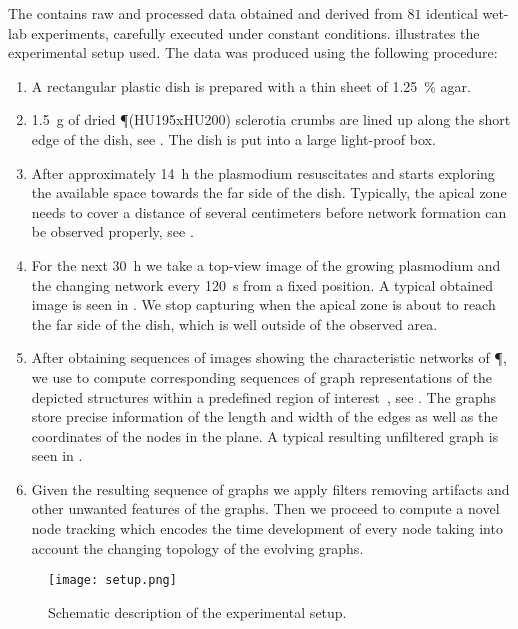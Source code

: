 	The \data contains raw and processed data obtained and derived from $81$ identical wet-lab experiments, carefully executed under constant conditions.  illustrates the experimental setup used. The data was produced using the following procedure:

	\begin{enumerate}
		\item A rectangular plastic dish is prepared with a thin sheet of \SI{1.25}{\percent} agar.
		\item \SI{1.5}{\gram} of dried \P (HU195xHU200) sclerotia crumbs are lined up along the short edge of the dish, see . The dish is put into a large light-proof box.
		\item After approximately \SI{14}{\hour} the plasmodium resuscitates and starts exploring the available space towards the far side of the dish. Typically, the apical zone needs to cover a distance of several centimeters before network formation can be observed properly, see .
		\item For the next \SI{30}{\hour} we take a top-view image of the growing plasmodium and the changing network every \SI{120}{\second} from a fixed position. A typical obtained image is seen in . We stop capturing when the apical zone is about to reach the far side of the dish, which is well outside of the observed area. 
		\item After obtaining sequences of images showing the characteristic networks of \P, we use \NEFI to compute corresponding sequences of graph representations of the depicted structures within a predefined region of interest~\cite{dirnberger2015nefi}, see . The graphs store precise information of the length and width of the edges as well as the coordinates of the nodes in the plane. A typical resulting unfiltered graph is seen in .
		\item Given the resulting sequence of graphs we apply filters removing artifacts and other unwanted features of the graphs. Then we proceed to compute a novel node tracking which encodes the time development of every node taking into account the changing topology of the evolving graphs.
	\end{enumerate}

	\begin{figure}
		\centering
		\texttt{[image: setup.png]}
		\caption[Setup for wetlab experiments]{Schematic description of the experimental setup.}
		\label{fig:setup}
	\end{figure}

